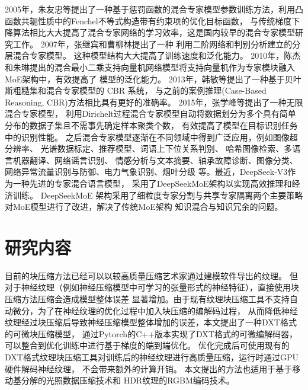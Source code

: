 2005年，朱友忠等\cite{JSJZ200505058}提出了一种基于惩罚函数的混合专家模型参数训练方法，利用凸函数共轭性质中的Fenchel不等式构造带有约束项的优化目标函数，
与传统梯度下降算法相比大大提高了混合专家网络的学习效率，这是国内较早的混合专家模型研究工作。
2007年，张继宾和曹柳林\cite{ASGT200704005}提出了一种
利用二阶网络和判别分析建立的分层混合专家模型。
这种模型结构大大提高了训练速度和泛化能力。
2010年，陈杰和朱琳\cite{KZLY201003005}提出的混合最小二乘支持向量机网络模型将支持向量机作为专家模块融入MoE架构中，有效提高了
模型的泛化能力。
2013年，韩敏等\cite{KZYC201301029}提出了一种基于贝叶斯粗糙集和混合专家模型的 CBR 系统，
与之前的案例推理(Case-Based Reasoning, CBR)方法相比具有更好的准确率。
2015年，张学峰等\cite{DZYX201501005}提出了一种无限混合专家模型，
利用Dirichelt过程混合专家模型自动将数据划分为多个具有简单分布的数据子集且不需事先确定样本聚类个数，
有效提高了模型在目标识别任务中的识别性能。
之后混合专家模型逐渐在不同领域中得到广泛应用，例如图像超分辨率\cite{1015982120.nh}、
光谱数据标定\cite{MOTO201604008}、推荐模型\cite{1023813150.nh}、词语上下位关系判别\cite{JSJA202302029}、
哈希图像检索\cite{1024896566.nh}、多语言机器翻译\cite{1025224898.nh}、网络谣言识别\cite{JCJS202306015}、
情感分析与文本摘要\cite{XDDJ202401017}、轴承故障诊断\cite{JSJY202501007}、图像分类\cite{JLDX202404018}、
网络异常流量识别与防御\cite{XXAQ202409013}、电力气象识别\cite{GWDZ202424018}、烟叶分级\cite{WJFZ2025042300F}
等。最近，DeepSeek-V3\cite{liu2024deepseek}作为一种先进的专家混合语言模型，
采用了DeepSeekMoE架构\cite{dai2024deepseekmoe}以实现高效推理和经济训练。
DeepSeekMoE 架构采用了细粒度专家分割与共享专家隔离两个主要策略对MoE模型进行了改进，解决了传统MoE架构
知识混合与知识冗余的问题。

\section{研究内容}

目前的块压缩方法已经可以以较高质量压缩艺术家通过建模软件导出的纹理。
但对于神经纹理（例如神经压缩模型中可学习的张量形式的神经特征），直接使用块压缩方法压缩会造成模型整体误差
显著增加。由于现有纹理块压缩工具不支持自动微分，为了在神经纹理的优化过程中加入块压缩的编解码过程，
从而降低神经纹理经过块压缩后导致神经压缩模型整体增加的误差，本文提出了一种DXT格式的可微块压缩模型，
通过Pytorch的C++版本实现了DXT格式的可微编解码器，可以整合到优化训练中进行基于梯度的端到端优化。
优化完成后可使用现有的DXT格式纹理块压缩工具对训练后的神经纹理进行高质量压缩，运行时通过GPU硬件解码神经纹理，
不会带来额外的计算开销。
本文提出的方法也适用于基于移动基分解的光照数据压缩技术\cite{silvennoinen2021moving}和
HDR纹理的RGBM编码技术。

